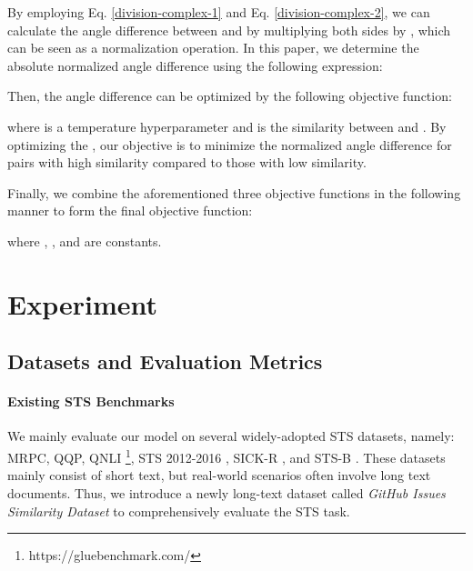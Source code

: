 \documentclass{article} \usepackage{iclr2024_conference,times}
\begin{document}
By employing Eq. \ref{division-complex-1} and Eq. \ref{division-complex-2}, we can calculate the angle difference between  and  by multiplying both sides by , which can be seen as a normalization operation. In this paper, we determine the absolute normalized angle difference using the following expression:

Then, the angle difference can be optimized by the following objective function:

where  is a temperature hyperparameter and  is the similarity between  and . By optimizing the , our objective is to minimize the normalized angle difference for pairs with high similarity compared to those with low similarity.

Finally, we combine the aforementioned three objective functions in the following manner to form the final objective function:

where , , and  are constants.


\section{Experiment}



\subsection{Datasets and Evaluation Metrics}
\paragraph{Existing STS Benchmarks} We mainly evaluate our model on several widely-adopted STS datasets, namely: MRPC, QQP, QNLI \footnote{https://gluebenchmark.com/}, STS 2012-2016 \citep{agirre-etal-2012-semeval, agirre-etal-2013-semeval, agirre-etal-2014-semeval, agirre-etal-2015-semeval, agirre-etal-2016-semeval}, SICK-R \citep{marelli-etal-2014-sick}, and STS-B \citep{cer-etal-2017-semeval}. These datasets mainly consist of short text, but real-world scenarios often involve long text documents. Thus, we introduce a newly long-text dataset called \textit{GitHub Issues Similarity Dataset} to comprehensively evaluate the STS task. 
\end{document}
